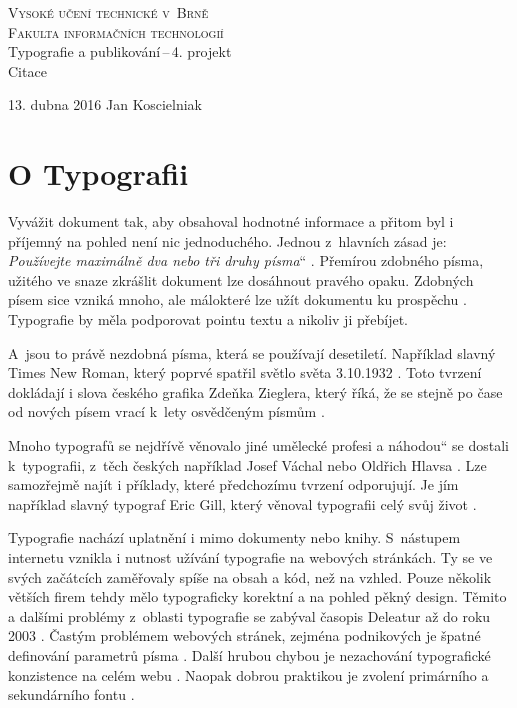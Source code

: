 \documentclass[11pt,a4paper]{article}
\providecommand{\uv}[1]{\quotedblbase #1\textquotedblleft}
\begin{document}
\begin{titlepage}
\begin{center}
\Huge
\textsc{Vysoké učení technické v~Brně}\\
\huge
\textsc{Fakulta informačních technologií\\}
\LARGE
Typografie a publikování\,--\,4. projekt \\
\Huge
Citace
\end{center} 
{\Large 13. dubna 2016 \hfill
Jan Koscielniak}
\end{titlepage}
\section*{O Typografii}

Vyvážit dokument tak, aby obsahoval hodnotné informace a přitom byl i příjemný na pohled není nic jednoduchého. Jednou z~hlavních zásad je: \uv{\emph{Používejte maximálně dva nebo tři druhy písma}} \citep{samara:2008}. Přemírou zdobného písma, užitého ve snaze zkrášlit dokument lze dosáhnout pravého opaku. Zdobných písem sice vzniká mnoho, ale málokteré lze užít dokumentu ku prospěchu \citep{Beran:2012}. Typografie by měla podporovat pointu textu a nikoliv ji přebíjet. \citep{Butterick:2010}

A~jsou to právě nezdobná písma, která se používají desetiletí. Například slavný Times New Roman, který poprvé spatřil světlo světa 3.10.1932 \citep{Tholenaar:2010}. Toto tvrzení dokládají i slova českého grafika Zdeňka Zieglera, který říká, že se stejně po čase od nových písem vrací k~lety osvědčeným písmům \citep{Krc:2012}. 

Mnoho typografů se nejdřívě věnovalo jiné umělecké profesi a \uv{náhodou} se dostali k~typografii, z~těch českých například Josef Váchal nebo Oldřich Hlavsa \citep{Storm:2008}. Lze samozřejmě najít i příklady, které předchozímu tvrzení odporujují. Je jím například slavný typograf Eric Gill, který věnoval typografii celý svůj život \citep{Gill:2014}. 

Typografie nachází uplatnění i mimo dokumenty nebo knihy. S~nástupem internetu vznikla i nutnost užívání typografie na webových stránkách. Ty se ve svých začátcích zaměřovaly spíše na obsah a kód, než na vzhled. Pouze několik větších firem tehdy mělo typograficky korektní a na pohled pěkný design. Těmito a dalšími problémy z~oblasti typografie se zabýval časopis Deleatur až do roku 2003 \citep{Deleatur:2012}. Častým problémem webových stránek, zejména podnikových je špatné definování parametrů písma \citep{Cecetka:2010}. Další hrubou chybou je nezachování typografické konzistence na celém webu \citep{Kyrnin:2016}. Naopak dobrou praktikou je zvolení primárního a sekundárního fontu \citep{Johnson:2015}.
\end{document}
